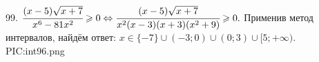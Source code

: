 99. $\cfrac{(x-5)\sqrt{x+7}}{x^6-81x^2}\geqslant0\Leftrightarrow
\cfrac{(x-5)\sqrt{x+7}}{x^2(x-3)(x+3)(x^2+9)}\geqslant0.$ Применив метод интервалов, найдём ответ: $x\in\{-7\}\cup(-3;0)\cup(0;3)\cup[5;+\infty).$
{{PIC:int96.png}}\\
